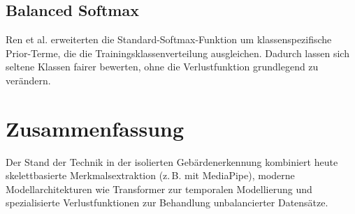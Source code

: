 \subsection{Balanced Softmax}
Ren et al. \cite{ren2020balanced} erweiterten die Standard-Softmax-Funktion um klassenspezifische Prior-Terme, die die Trainingsklassenverteilung ausgleichen. Dadurch lassen sich seltene Klassen fairer bewerten, ohne die Verlustfunktion grundlegend zu verändern.

\section{Zusammenfassung}
Der Stand der Technik in der isolierten Gebärdenerkennung kombiniert heute skelettbasierte Merkmalsextraktion (z.\,B. mit MediaPipe), moderne Modellarchitekturen wie Transformer zur temporalen Modellierung und spezialisierte Verlustfunktionen zur Behandlung unbalancierter Datensätze.